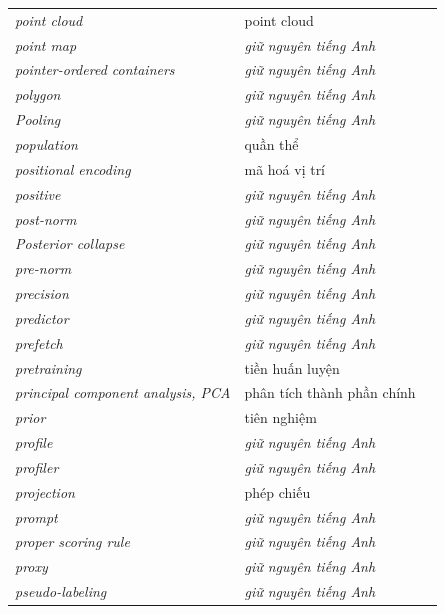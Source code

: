 \documentclass[deep_learning.tex]{subfiles}
\begin{document}
\begin{longtable}{@{}L{5.2cm}L{5.9cm}L{2.6cm}@{}}
\emph{point cloud} & point cloud & \\
\emph{point map} & \emph{\color{tiercol}giữ nguyên tiếng Anh} & \\
\emph{pointer-ordered containers} & \emph{\color{tiercol}giữ nguyên tiếng Anh} & \\
\emph{polygon} & \emph{\color{tiercol}giữ nguyên tiếng Anh} & \\
\emph{Pooling} & \emph{\color{tiercol}giữ nguyên tiếng Anh} & \\
\emph{population} & quần thể & \\
\emph{positional encoding} & mã hoá vị trí & \\
\emph{positive} & \emph{\color{tiercol}giữ nguyên tiếng Anh} & \\
\emph{post-norm} & \emph{\color{tiercol}giữ nguyên tiếng Anh} & \\
\emph{Posterior collapse} & \emph{\color{tiercol}giữ nguyên tiếng Anh} & \\
\emph{pre-norm} & \emph{\color{tiercol}giữ nguyên tiếng Anh} & \\
\emph{precision} & \emph{\color{tiercol}giữ nguyên tiếng Anh} & \\
\emph{predictor} & \emph{\color{tiercol}giữ nguyên tiếng Anh} & \\
\emph{prefetch} & \emph{\color{tiercol}giữ nguyên tiếng Anh} & \\
\emph{pretraining} & tiền huấn luyện & \\
\emph{principal component analysis, PCA} & phân tích thành phần chính & \\
\emph{prior} & tiên nghiệm & \\
\emph{profile} & \emph{\color{tiercol}giữ nguyên tiếng Anh} & \\
\emph{profiler} & \emph{\color{tiercol}giữ nguyên tiếng Anh} & \\
\emph{projection} & phép chiếu & \\
\emph{prompt} & \emph{\color{tiercol}giữ nguyên tiếng Anh} & \\
\emph{proper scoring rule} & \emph{\color{tiercol}giữ nguyên tiếng Anh} & \\
\emph{proxy} & \emph{\color{tiercol}giữ nguyên tiếng Anh} & \\
\emph{pseudo-labeling} & \emph{\color{tiercol}giữ nguyên tiếng Anh} & \\

\end{longtable}
\end{document}
